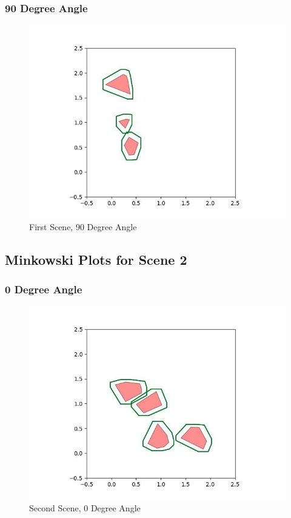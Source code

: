 \documentclass{article}
\begin{document}
\newpage
\subsubsection{90 Degree Angle}
\begin{figure}[h!]
	\includegraphics[width= 0.9 \linewidth]{Problem3_minkowski1_90.jpg}
	\centering
	\caption{First Scene, 90 Degree Angle}
	\label{Problem3_minkowski1_90.jpg}
\end{figure}

\newpage
\subsection{Minkowski Plots for Scene 2}
\subsubsection{0 Degree Angle}
\begin{figure}[h!]
	\includegraphics[width= 0.9 \linewidth]{Problem3_minkowski2_0.jpg}
	\centering
	\caption{Second Scene, 0 Degree Angle}
	\label{Problem3_minkowski2_0.jpg}
\end{figure}
\end{document}
